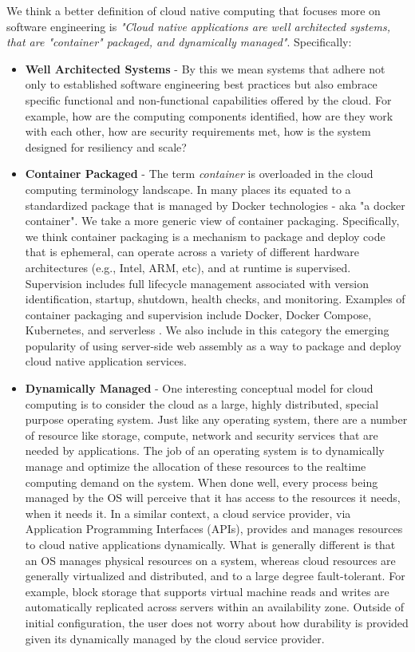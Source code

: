 \documentclass[conference]{IEEEconf}
\begin{document}
We think a better definition of cloud native computing that focuses more on  software engineering is \textit{"Cloud native applications are well architected systems, that are "container" packaged, and dynamically managed"}. Specifically:

\begin{itemize}
	\item \textbf{Well Architected Systems} - By this we mean systems that adhere not only to established software engineering best practices but also embrace specific functional and non-functional capabilities offered by the cloud. For example, how are the computing components identified, how are they work with each other, how are security requirements met, how is the system designed for resiliency and scale?
	
	\item  \textbf{Container Packaged} - The term \textit{container} is overloaded in the cloud computing terminology landscape.  In many places its equated to a standardized package that is managed by Docker\cite{DockerContainer} technologies - aka "a docker container".  We take a more generic view of container packaging. Specifically, we think container packaging is a mechanism to package and deploy code that is ephemeral, can operate across a variety of different hardware architectures (e.g., Intel, ARM, etc), and at runtime is supervised.  Supervision includes full lifecycle management associated with version identification, startup, shutdown, health checks, and monitoring.  Examples of container packaging and supervision include Docker, Docker Compose, Kubernetes, and serverless \cite{baldini2017serverless}. We also include in this category the emerging popularity of using server-side web assembly\cite{haas2017bringing, bosshard2020use} as a way to package and deploy cloud native application services. 

	\item \textbf{Dynamically Managed} - One interesting conceptual model for cloud computing is to consider the cloud as a large, highly distributed, special purpose operating system. Just like any operating system, there are a number of resource like storage, compute, network and security services that are needed by applications.  The job of an operating system is to dynamically manage and optimize the allocation of these resources to the realtime computing demand on the system.  When done well, every process being managed by the OS will perceive that it has access to the resources it needs, when it needs it.  In a similar context, a cloud service provider, via Application Programming Interfaces (APIs), provides and manages resources to cloud native applications dynamically. What is generally different is that an OS manages physical resources on a system, whereas cloud resources are generally virtualized and distributed, and to a large degree fault-tolerant.  For example, block storage that supports virtual machine reads and writes are automatically replicated across servers within an availability zone. Outside of initial configuration, the user does not worry about how durability is provided given its dynamically managed by the cloud service provider. 
	
	 
\end{itemize} 
\end{document}
